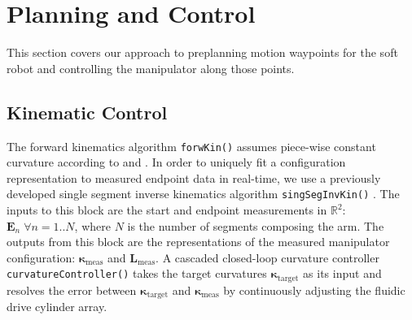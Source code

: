 \section{Planning and Control}
\label{sec:processing_and_control}
This section covers our approach to preplanning motion waypoints for the soft robot and controlling the manipulator along those points. 

\subsection{Kinematic Control}
The forward kinematics algorithm \texttt{forwKin()} assumes piece-wise constant curvature according to \cite{webster2010design} and \cite{marchese2014design}. 
In order to uniquely fit a configuration representation to measured endpoint data in real-time, we use a previously developed single segment inverse kinematics algorithm \texttt{singSegInvKin()} \cite{marchese2014design}.
The inputs to this block are the start and endpoint measurements in $\mathbb{R}^2$: $\mathbf{E}_n \; \forall n  = 1..N$, where $N$ is the number of segments composing the arm.
The outputs from this block are the representations of the measured manipulator configuration:  $\boldsymbol{\kappa}_{\textrm{meas}}$ and  $\mathbf{L}_{\textrm{meas}}$.
A cascaded closed-loop curvature controller \texttt{curvatureController()} takes the target curvatures $\boldsymbol{\kappa}_{\textrm{target}}$ as its input and resolves the error between $\boldsymbol{\kappa}_{\textrm{target}}$ and $\boldsymbol{\kappa}_{\textrm{meas}}$ by continuously adjusting the fluidic drive cylinder array.


